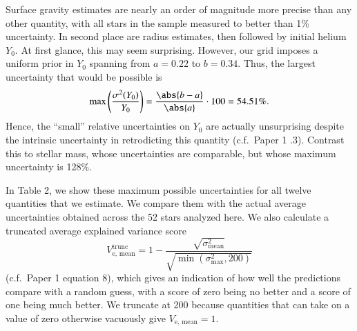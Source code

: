 \documentclass[epj,twocolumn]{webofc}
\begin{document}
Surface gravity estimates are nearly an order of magnitude more precise than any other quantity, with all stars in the sample measured to better than 1\% uncertainty. In second place are radius estimates, then followed by initial helium $Y_0$. At first glance, this may seem surprising. However, our grid imposes a uniform prior in $Y_0$ spanning from $a=0.22$ to $b=0.34$. 
Thus, the largest uncertainty that would be possible is
\begin{equation}
    \max \left( \frac{\sigma^2(Y_0)}{Y_0} \right) = \frac{\abs{b-a}}{\abs{a}} \cdot 100 = 54.51\%.
\end{equation}
Hence, the ``small'' relative uncertainties on $Y_0$ are actually unsurprising despite the intrinsic uncertainty in retrodicting this quantity (c.f.~Paper 1 .3). Contrast this to stellar mass, whose uncertainties are comparable, but whose maximum uncertainty is 128\%. 

\afterpage{
    \clearpage
    \setcounter{table}{0}
    \begin{landscape}
        
    \end{landscape}
    \clearpage
}

In Table 2, we show these maximum possible uncertainties for all twelve quantities that we estimate. We compare them with the actual average uncertainties obtained across the 52 stars analyzed here. We also calculate a truncated average explained variance score
\begin{equation}
    V_{\text{e, mean}}^{\text{trunc}} = 1 - \frac{ 
            \sqrt{\sigma^2_{\text{mean}}} 
        } { 
            \sqrt{\min \left( \sigma^2_{\max}, 200 \right)}
    }
\end{equation} (c.f.~Paper 1 equation 8), which gives an indication of how well the predictions compare with a random guess, with a score of zero being no better and a score of one being much better. We truncate at 200 because quantities that can take on a value of zero otherwise vacuously give $V_{\text{e, mean}}=1$. 
\end{document}
